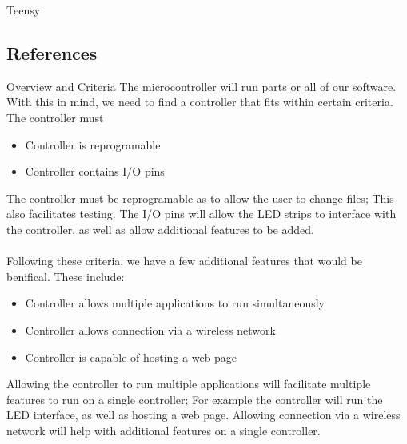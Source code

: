 Teensy\documentclass[onecolumn, draftclsnofoot,10pt, compsoc]{IEEEtran}
\begin{document}
\newpage

\tableofcontents
\clearpage
\singlespace


		\subsection{References}

		\begingroup
			\renewcommand{\addcontentsline}[3]{}%
			\renewcommand{\section}[2]{}%

			
			

		\endgroup
		\newpage
	\section{Microcontroller}
		\subsection{Overview and Criteria}
		The microcontroller will run parts or all of our software. With this in mind,
		we need to find a controller that fits within certain criteria. The
		controller must
		\begin{itemize}
			\item Controller is reprogramable
			\item Controller contains I/O pins
		\end{itemize}
		The controller must be reprogramable as to allow the user to change files;
		This also facilitates testing. The I/O pins will allow the LED strips to
		interface with the controller, as well as allow additional features to be
		added.
		\\\\
		Following these criteria, we have a few additional features that would be
		benifical. These include:
		\begin{itemize}
			\item Controller allows multiple applications to run simultaneously
			\item Controller allows connection via a wireless network
			\item Controller is capable of hosting a web page
		\end{itemize}
		Allowing the controller to run multiple applications will facilitate
		multiple features to run on a single controller; For example the controller
		will run the LED interface, as well as hosting a web page. Allowing
		connection via a wireless network will help with additional features on a
		single controller.
\end{document}
